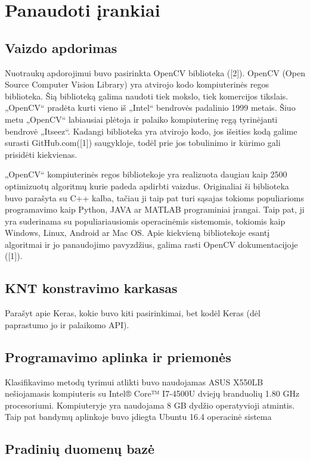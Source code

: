 \documentclass{VUMIFInfBakalaurinis}
\begin{document}
\section{Panaudoti įrankiai}
\subsection{Vaizdo apdorimas}
Nuotraukų apdorojimui buvo pasirinkta OpenCV biblioteka ([2]). OpenCV (Open Source Computer Vision Library) yra atvirojo kodo kompiuterinės regos biblioteka. Šią biblioteką galima naudoti tiek mokslo, tiek komercijos tikslais. „OpenCV“ pradėta kurti vieno iš „Intel“ bendrovės padalinio 1999 metais. Šiuo metu „OpenCV“ labiausiai plėtoja ir palaiko kompiuterinę regą tyrinėjanti bendrovė „Itseez“. Kadangi biblioteka yra atvirojo kodo, jos išeities kodą galime surasti GitHub.com([1]) saugykloje, todėl prie jos tobulinimo ir kūrimo gali prisidėti kiekvienas.

„OpenCV“ kompiuterinės regos bibliotekoje yra realizuota daugiau kaip 2500 optimizuotų algoritmų kurie padeda apdirbti vaizdus. Originaliai ši biblioteka buvo parašyta su C++ kalba, tačiau ji taip pat turi sąsajas tokioms populiarioms programavimo kaip Python, JAVA ar MATLAB programiniai įrangai. Taip pat, ji yra suderinama su populiariausiomis operacinėmis sistemomis, tokiomis kaip Windows, Linux, Android ar Mac OS. Apie kiekvieną bibliotekoje esantį algoritmai ir jo panaudojimo pavyzdžius, galima rasti OpenCV dokumentacijoje ([1]).
\subsection{KNT konstravimo karkasas}

Parašyt apie Keras, kokie buvo kiti pasirinkimai, bet kodėl Keras (dėl paprastumo jo ir palaikomo API).

\subsection{Programavimo aplinka ir priemonės}
Klasifikavimo metodų tyrimui atlikti buvo naudojamas ASUS X550LB nešiojamasis kompiuteris su Intel® Core™ I7-4500U dviejų branduolių 1.80 GHz procesoriumi. Kompiuteryje yra naudojama 8 GB dydžio operatyvioji atmintis. Taip pat bandymų aplinkoje buvo įdiegta Ubuntu 16.4 operacinė sistema

\subsection{Pradinių duomenų bazė}
\end{document}
